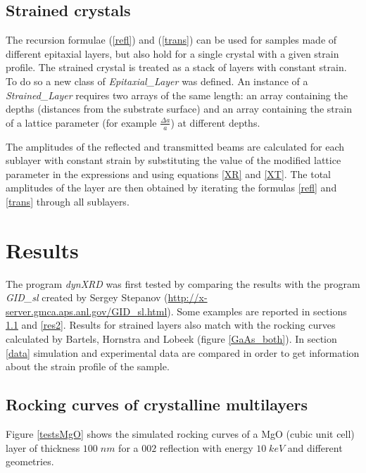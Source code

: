 \documentclass[12pt,oneside,notitlepage,abstracton,a4paper]{scrartcl}
\begin{document}

\subsection{Strained crystals} \label{strcr}
The recursion formulae (\ref{refl}) and (\ref{trans}) can be used for samples made of different epitaxial layers, but also hold for a single crystal with a given strain profile. The strained crystal is treated as a stack of layers with constant strain. To do so a new class of \textit{Epitaxial\_Layer} was defined. An instance of a \textit{Strained\_Layer} requires two arrays of the same length: an array containing the depths (distances from the substrate surface) and an array containing the strain of a lattice parameter (for example $\frac{\Delta a}{a}$) at different depths.

The amplitudes of the reflected and transmitted beams are calculated for each sublayer with constant strain by substituting the value of the modified lattice parameter in the expressions and using equations \ref{XR} and \ref{XT}. The total amplitudes of the layer are then obtained by iterating the formulas \ref{refl} and \ref{trans} through all sublayers.




\section{Results}

The program \textit{dynXRD} was first tested by comparing the results with the program \textit{GID\_sl} created by Sergey Stepanov (\url{http://x-server.gmca.aps.anl.gov/GID_sl.html}). Some examples are reported in sections \ref{res1} and \ref{res2}. Results for strained layers also match with the rocking curves calculated by Bartels, Hornstra and Lobeek \cite{Bartels:a25435} (figure \ref{GaAs_both}). In section \ref{data} simulation and experimental data are compared in order to get information about the strain profile of the sample.


\subsection{Rocking curves of crystalline multilayers}\label{res1}
Figure \ref{testsMgO} shows the simulated rocking curves of a MgO (cubic unit cell) layer of thickness $100\;nm$ for a $002$ reflection with energy $10\; keV$ and different geometries.
\end{document}
